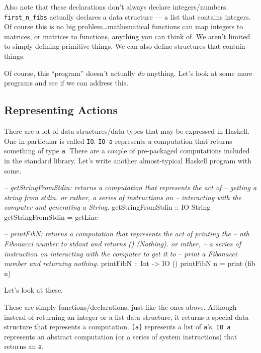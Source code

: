 \documentclass[]{article}
\newenvironment{Shaded}{}{}
\newcommand{\DataTypeTok}[1]{\textcolor[rgb]{0.56,0.13,0.00}{{#1}}}
\newcommand{\CommentTok}[1]{\textcolor[rgb]{0.38,0.63,0.69}{\textit{{#1}}}}
\newcommand{\OtherTok}[1]{\textcolor[rgb]{0.00,0.44,0.13}{{#1}}}
\newcommand{\FunctionTok}[1]{\textcolor[rgb]{0.02,0.16,0.49}{{#1}}}
\newcommand{\NormalTok}[1]{{#1}}
\begin{document}
Also note that these declarations don't always declare integers/numbers.
\texttt{first\_n\_fibs} actually declares a data structure --- a list
that contains integers. Of course this is no big
problem\ldots{}mathematical functions can map integers to matrices, or
matrices to functions, anything you can think of. We aren't limited to
simply defining primitive things. We can also define structures that
contain things.

Of course, this ``program'' doesn't actually \emph{do} anything. Let's
look at some more programs and see if we can address this.

\subsection{Representing Actions}\label{representing-actions}

There are a lot of data structures/data types that may be expressed in
Haskell. One in particular is called \texttt{IO}. \texttt{IO\ a}
represents a computation that returns something of type \texttt{a}.
There are a couple of pre-packaged computations included in the standard
library. Let's write another almost-typical Haskell program with some.

\begin{Shaded}
\begin{Highlighting}[]
\CommentTok{--  getStringFromStdin: returns a computation that represents the act of}
\CommentTok{--      getting a string from stdin.  or rather, a series of instructions on}
\CommentTok{--      interacting with the computer and generating a String.}
\OtherTok{getStringFromStdin ::} \DataTypeTok{IO} \DataTypeTok{String}
\NormalTok{getStringFromStdin }\FunctionTok{=} \NormalTok{getLine}

\CommentTok{--  printFibN: returns a computation that represents the act of printing the}
\CommentTok{--      nth Fibonacci number to stdout and returns () (Nothing).  or rather,}
\CommentTok{--      a series of instruction on interacting with the computer to get it to}
\CommentTok{--      print a Fibonacci number and returning nothing.}
\OtherTok{printFibN ::} \DataTypeTok{Int} \OtherTok{->} \DataTypeTok{IO} \NormalTok{()}
\NormalTok{printFibN n }\FunctionTok{=} \NormalTok{print (fib n)}
\end{Highlighting}
\end{Shaded}

Let's look at these.

These are simply functions/declarations, just like the ones above.
Although instead of returning an integer or a list data structure, it
returns a special data structure that represents a computation.
\texttt{{[}a{]}} represents a list of \texttt{a}'s. \texttt{IO\ a}
represents an abstract computation (or a series of system instructions)
that returns an \texttt{a}.
\end{document}
